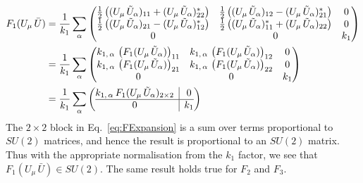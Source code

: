 %
\begin{align}
F_1(U_\mu \, \bar{U}) &= \frac{1}{k_1}\sum_\alpha
\begin{pmatrix}
\frac{1}{2}\left((U_\mu \, \tilde{U}_\alpha)_{11} + (U_\mu \, \tilde{U}_\alpha)^*_{22}\right) & \frac{1}{2}\left((U_\mu \, \tilde{U}_\alpha)_{12} - (U_\mu \, \tilde{U}_\alpha)^*_{21}\right) & 0\\
\frac{1}{2}\left((U_\mu \, \tilde{U}_\alpha)_{21} - (U_\mu \, \tilde{U}_\alpha)^*_{12}\right) & \frac{1}{2}\left((U_\mu \, \tilde{U}_\alpha)^*_{11} + (U_\mu \, \tilde{U}_\alpha)_{22}\right) & 0\\
0 & 0 & k_1
\end{pmatrix}\nonumber\\
&=\frac{1}{k_1}\sum_\alpha
\begin{pmatrix}
k_{1,\,\alpha}\,\left(F_1(U_\mu\,\tilde{U}_\alpha)\right)_{11} & k_{1,\,\alpha}\,\left(F_1(U_\mu\,\tilde{U}_\alpha)\right)_{12} & 0\\
k_{1,\,\alpha}\,\left(F_1(U_\mu\,\tilde{U}_\alpha)\right)_{21} & k_{1,\,\alpha}\,\left(F_1(U_\mu\,\tilde{U}_\alpha)\right)_{22} & 0\\
0 & 0 & k_1
\end{pmatrix}\nonumber\\
&=\frac{1}{k_1}\sum_\alpha
\left(\begin{array}{@{}c|c@{}}
k_{1,\,\alpha} \,F_1(U_\mu\,\tilde{U}_\alpha)_{2\times 2} & 0\\
  \hline 
0 & k_1
\end{array}\right)
\label{eq:FExpansion}
\end{align}
%
The $2\times 2$ block in Eq.~\ref{eq:FExpansion} is a sum over terms proportional to $SU(2)$ matrices, and hence the result is proportional to an $SU(2)$ matrix. Thus with the appropriate normalisation from the $k_1$ factor, we see that $F_1(U_\mu \, \bar{U})\in SU(2)$. The same result holds true for $F_2$ and $F_3$.\\

